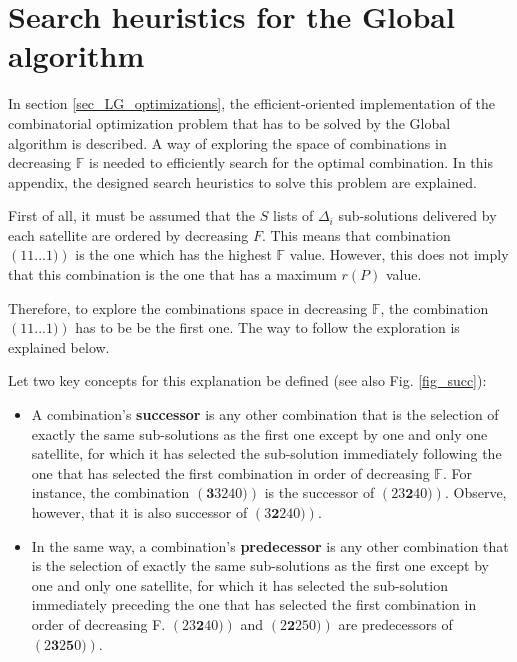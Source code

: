 
\chapter{Search heuristics for the Global algorithm} %

\label{AppendixB} %

In section \ref{sec_LG_optimizations}, the efficient-oriented implementation of the combinatorial optimization problem that has to be solved by the Global algorithm is described. A way of exploring the space of combinations in decreasing $\mathbb{F}$ is needed to efficiently search for the optimal combination. In this appendix, the designed search heuristics to solve this problem are explained.

First of all, it must be assumed that the $S$ lists of $\Delta_i$ sub-solutions delivered by each satellite are ordered by decreasing $F$. This means that combination $\left(1 1 ... 1)\right)$ is the one which has the highest $\mathbb{F}$ value. However, this does not imply that this combination is the one that has a maximum $r(P)$ value.

Therefore, to explore the combinations space in decreasing $\mathbb{F}$, the combination $\left(1 1 ... 1)\right)$ has to be be the first one. The way to follow the exploration is explained below.

Let two key concepts for this explanation be defined (see also Fig. \ref{fig_succ}):
\begin{itemize}
\item A combination's \textbf{successor} is any other combination that is the selection of exactly the same sub-solutions as the first one except by one and only one satellite, for which it has selected the sub-solution immediately following the one that has selected the first combination in order of decreasing $\mathbb{F}$. For instance, the combination $\left(\mathbf{3} 3 2 4 0)\right)$ is the successor of $\left(2 3 \mathbf{2} 4 0)\right)$. Observe, however, that it is also successor of $\left(3 \mathbf{2} 2 4 0)\right)$.
\item In the same way, a combination's \textbf{predecessor} is any other combination that is the selection of exactly the same sub-solutions as the first one except by one and only one satellite, for which it has selected the sub-solution immediately preceding the one that has selected the first combination in order of decreasing F. $\left(2 3 \mathbf{2} 4 0)\right)$ and $\left(2 \mathbf{2} 2 5 0)\right)$ are predecessors of $\left(2 \mathbf{3} 2 \mathbf{5} 0)\right)$.
\end{itemize}

